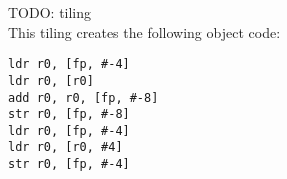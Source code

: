 TODO: tiling \\
This tiling creates the following object code:

\begin{lstlisting}
ldr r0, [fp, #-4]
ldr r0, [r0]
add r0, r0, [fp, #-8]
str r0, [fp, #-8]
ldr r0, [fp, #-4]
ldr r0, [r0, #4]
str r0, [fp, #-4]
\end{lstlisting}
